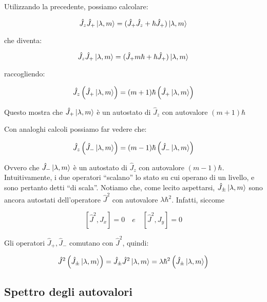 Utilizzando la precedente, possiamo calcolare:

	\begin{equation}
		\hat{J}_z \hat{J}_+ \ket{ \lambda, m} = ( \hat{J}_+ \hat{J}_z + \hbar \hat{J}_+ ) \ket{\lambda, m}
	\end{equation}

che diventa:

	\begin{equation}
		\hat{J}_z \hat{J}_+ \ket{\lambda, m} = (\hat{J}_+ m \hbar + \hbar \hat{J}_+ ) \ket{\lambda, m}
	\end{equation}

raccogliendo:

	\begin{equation}
		\hat{J}_z \left ( \hat{J}_+ \ket{\lambda, m} \right ) = (m + 1) \hbar \left ( \hat{J}_+ \ket{\lambda, m} \right )
	\end{equation}

Questo mostra che $\hat{J}_+ \ket{\lambda, m}$ \`e un autostato di $\hat{J}_z$ con autovalore $(m+1) \hbar$

Con analoghi calcoli possiamo far vedere che:

	\begin{equation}
		\hat{J}_z \left ( \hat{J}_- \ket{\lambda, m} \right ) = (m - 1) \hbar \left ( \hat{J}_- \ket{\lambda, m} \right )
	\end{equation}

Ovvero che $\hat{J}_- \ket{\lambda, m}$ \`e un autostato di $\hat{J}_z$ con autovalore $(m-1) \hbar$. Intuitivamente, i due operatori ``scalano'' lo stato su cui operano di un livello, e sono pertanto detti ``di scala''.
Notiamo che, come lecito aspettarsi, $\hat{J}_\pm \ket{\lambda, m}$ sono ancora autostati dell'operatore $\hat{J}^2$ con autovalore $\lambda \hbar^2$. Infatti, siccome

	\begin{equation}
		\left [ \hat{J}^2, J_x \right ] = 0 \quad e \quad \left [ \hat{J}^2, J_y \right ] = 0
	\end{equation}

Gli operatori $\hat{J}_+, \hat{J}_-$ comutano con $\hat{J}^2$, quindi:

	\begin{equation}
		\hat{J}^2 \left ( \hat{J}_\pm \ket{\lambda, m} \right ) = \hat{J}_\pm \hat{J}^2 \ket{\lambda, m} = \lambda \hbar^2 \left (
			\hat{J}_\pm \ket{\lambda, m} \right )
	\end{equation}

\subsection{Spettro degli autovalori}

